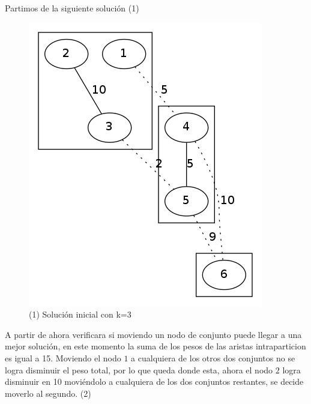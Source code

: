 Partimos de la siguiente solución (1)
\begin{figure}[H]
\begin{center}
\includegraphics[scale=0.4]{./img/local1.png}
\caption{(1) Solución inicial con k=3}
\end{center}
\end{figure}

A partir de ahora verificara si moviendo un nodo de conjunto puede llegar a una mejor solución, en este momento la suma de los pesos de las aristas intraparticion es igual a 15. Moviendo el nodo $1$ a cualquiera de los otros dos conjuntos no se logra disminuir el peso total, por lo que queda donde esta, ahora el nodo $2$ logra disminuir en 10 moviéndolo a cualquiera de los dos conjuntos restantes, se decide moverlo al segundo. (2)

